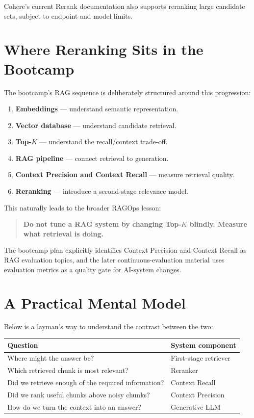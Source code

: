 \documentclass[12pt, a4paper]{article}
\begin{document}
Cohere's current Rerank documentation also supports reranking large candidate sets, subject to endpoint and model limits.

\section{Where Reranking Sits in the Bootcamp}

The bootcamp's RAG sequence is deliberately structured around this progression:

\begin{enumerate}
    \item \textbf{Embeddings} --- understand semantic representation.
    \item \textbf{Vector database} --- understand candidate retrieval.
    \item \textbf{Top-$K$} --- understand the recall/context trade-off.
    \item \textbf{RAG pipeline} --- connect retrieval to generation.
    \item \textbf{Context Precision and Context Recall} --- measure retrieval quality.
    \item \textbf{Reranking} --- introduce a second-stage relevance model.
\end{enumerate}

This naturally leads to the broader RAGOps lesson:

\begin{quote}
\textbf{Do not tune a RAG system by changing Top-$K$ blindly. Measure what retrieval is doing.}
\end{quote}

The bootcamp plan explicitly identifies Context Precision and Context Recall as RAG evaluation topics, and the later continuous-evaluation material uses evaluation metrics as a quality gate for AI-system changes.

\section{A Practical Mental Model}

Below is a layman's way to understand the contrast between the two:
\begin{center}
\begin{tabular}{p{}p{}}
\toprule
\textbf{Question} & \textbf{System component}\\
\midrule
Where might the answer be? & First-stage retriever\\
Which retrieved chunk is most relevant? & Reranker\\
Did we retrieve enough of the required information? & Context Recall\\
Did we rank useful chunks above noisy chunks? & Context Precision\\
How do we turn the context into an answer? & Generative LLM\\
\bottomrule
\end{tabular}
\end{center}
\end{document}
